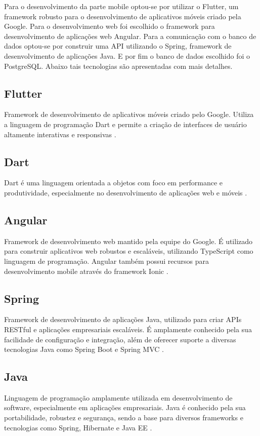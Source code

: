 Para o desenvolvimento da parte mobile optou-se por utilizar o Flutter, um framework robusto para o desenvolvimento de aplicativos móveis criado pela Google. Para o desenvolvimento web foi escolhido o framework para desenvolvimento de aplicações web Angular. Para a comunicação com o banco de dados optou-se por construir uma API utilizando o Spring, framework de desenvolvimento de aplicações Java. E por fim o banco de dados escolhido foi o PostgreSQL. Abaixo tais tecnologias são apresentadas com mais detalhes.

\subsection{Flutter}
Framework de desenvolvimento de aplicativos móveis criado pelo Google. Utiliza a linguagem de programação Dart e permite a criação de interfaces de usuário altamente interativas e responsivas \cite{flutter}.


\subsection{Dart}
Dart é uma linguagem orientada a objetos com foco em performance e produtividade, especialmente no desenvolvimento de aplicações web e móveis \cite{dart}.

\subsection{Angular}
Framework de desenvolvimento web mantido pela equipe do Google. É utilizado para construir aplicativos web robustos e escaláveis, utilizando TypeScript como linguagem de programação. Angular também possui recursos para desenvolvimento mobile através do framework Ionic \cite{angular}.

\subsection{Spring}
Framework de desenvolvimento de aplicações Java, utilizado para criar APIs RESTful e aplicações empresariais escaláveis. É amplamente conhecido pela sua facilidade de configuração e integração, além de oferecer suporte a diversas tecnologias Java como Spring Boot e Spring MVC \cite{spring}.

\subsection{Java}
Linguagem de programação amplamente utilizada em desenvolvimento de software, especialmente em aplicações empresariais. Java é conhecido pela sua portabilidade, robustez e segurança, sendo a base para diversos frameworks e tecnologias como Spring, Hibernate e Java EE \cite{java}.

